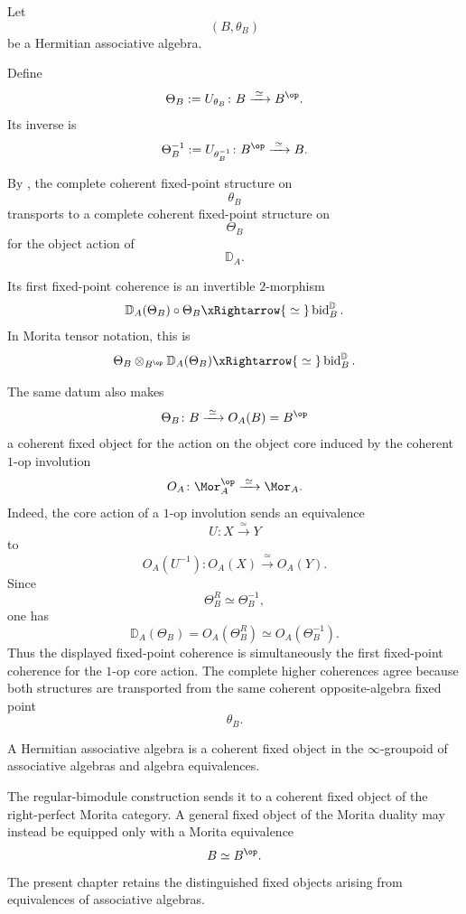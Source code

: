 \begin{construction}
\label{con:regular-morita-fixed-point}
Let
\[
    (B,\theta_B)
\]
be a Hermitian associative algebra.

Define
\[
    \Theta_B
    :=
    U_{\theta_B}
    \colon
    B
    \xrightarrow{\;\simeq\;}
    B^{\op}.
\]
Its inverse is
\[
    \Theta_B^{-1}
    :=
    U_{\theta_B^{-1}}
    \colon
    B^{\op}
    \xrightarrow{\;\simeq\;}
    B.
\]

By
,
the complete coherent fixed-point structure on
\[
    \theta_B
\]
transports to a complete coherent fixed-point structure on
\[
    \Theta_B
\]
for the object action of
\[
    \mathbb D_A.
\]

Its first fixed-point coherence is an invertible $2$-morphism
\[
    \mathbb D_A(\Theta_B)\circ\Theta_B
    \xRightarrow{\;\simeq\;}
    \operatorname{bid}^{\mathbb D}_B.
\]
In Morita tensor notation, this is
\[
    \Theta_B
    \otimes_{B^{\op}}
    \mathbb D_A(\Theta_B)
    \xRightarrow{\;\simeq\;}
    \operatorname{bid}^{\mathbb D}_B.
\]

The same datum also makes
\[
    \Theta_B
    \colon
    B
    \xrightarrow{\;\simeq\;}
    O_A(B)=B^{\op}
\]
a coherent fixed object for the action on the object core induced by the
coherent $1$-op involution
\[
    O_A
    \colon
    \Mor_A^{\op}
    \xrightarrow{\;\simeq\;}
    \Mor_A.
\]
Indeed, the core action of a $1$-op involution sends an equivalence
\[
    U
    \colon
    X
    \xrightarrow{\;\simeq\;}
    Y
\]
to
\[
    O_A(U^{-1})
    \colon
    O_A(X)
    \xrightarrow{\;\simeq\;}
    O_A(Y).
\]
Since
\[
    \Theta_B^R
    \simeq
    \Theta_B^{-1},
\]
one has
\[
    \mathbb D_A(\Theta_B)
    =
    O_A(\Theta_B^R)
    \simeq
    O_A(\Theta_B^{-1}).
\]
Thus the displayed fixed-point coherence is simultaneously the first
fixed-point coherence for the $1$-op core action. The complete higher
coherences agree because both structures are transported from the same
coherent opposite-algebra fixed point
\[
    \theta_B.
\]
\end{construction}

\begin{remark}
\label{rem:hermitian-homotopy-fixed-points}
A Hermitian associative algebra is a coherent fixed object in the
$\infty$-groupoid of associative algebras and algebra equivalences.

The regular-bimodule construction sends it to a coherent fixed object of
the right-perfect Morita category. A general fixed object of the Morita
duality may instead be equipped only with a Morita equivalence
\[
    B
    \simeq
    B^{\op}.
\]
The present chapter retains the distinguished fixed objects arising from
equivalences of associative algebras.
\end{remark}

